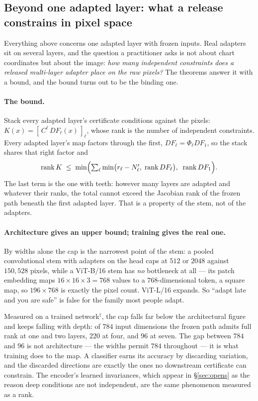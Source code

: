 \subsection{Beyond one adapted layer: what a release constrains in pixel space}
\label{sec:pixels}

Everything above concerns one adapted layer with frozen inputs. Real adapters
sit on several layers, and the question a practitioner asks is not about chart
coordinates but about the image: \emph{how many independent constraints does a
released multi-layer adapter place on the raw pixels?} The theorems answer it
with a bound, and the bound turns out to be the binding one.

\paragraph{The bound.} Stack every adapted layer's certificate conditions
against the pixels: $K(x)=[\,C^\ell\,DF_\ell(x)\,]_\ell$, whose rank is the
number of independent constraints. Every adapted layer's map factors through
the first, $DF_\ell=\Phi_\ell DF_1$, so the stack shares that right factor and
\[
  \operatorname{rank}K\;\le\;\min\Bigl(\textstyle\sum_\ell\min\bigl(r_\ell-N'_\ell,\;\operatorname{rank}DF_\ell\bigr),\;\;\operatorname{rank}DF_1\Bigr).
\]
The last term is the one with teeth: however many layers are adapted and
whatever their ranks, the total cannot exceed the Jacobian rank of the frozen
path beneath the first adapted layer. That is a property of the stem, not of
the adapters.

\paragraph{Architecture gives an upper bound; training gives the real one.}
By widths alone the cap is the narrowest point of the stem: a pooled
convolutional stem with adapters on the head caps at $512$ or $2048$ against
$150{,}528$ pixels, while a ViT-B/16 stem has \emph{no} bottleneck at all ---
its patch embedding maps $16\times16\times3=768$ values to a $768$-dimensional
token, a square map, so $196\times768$ is exactly the pixel count. ViT-L/16
expands. So ``adapt late and you are safe'' is false for the family most
people adapt.

Measured on a trained network$^\dagger$, the cap falls far below the
architectural figure and keeps falling with depth: of $784$ input dimensions
the frozen path admits full rank at one and two layers, $220$ at four, and
$96$ at seven. The gap between $784$ and $96$ is not architecture --- the
widths permit $784$ throughout --- it is what training does to the map. A
classifier earns its accuracy by discarding variation, and the discarded
directions are exactly the ones no downstream certificate can constrain. The
encoder's learned invariances, which appear in \S\ref{sec:opens} as the reason
deep conditions are not independent, are the same phenomenon measured as a
rank.

